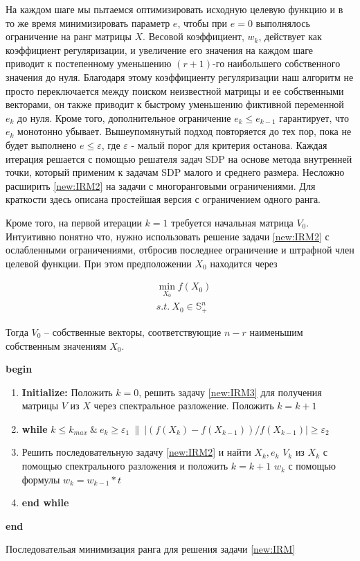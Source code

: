 \documentclass[oneside,final,14pt]{extreport} %
\begin{document}
На каждом шаге мы пытаемся оптимизировать исходную целевую функцию и в то же время минимизировать параметр $e$, чтобы при $e = 0$ выполнялось ограничение на ранг матрицы $X$. Весовой коэффициент, $w_k$, действует как коэффициент регуляризации, и увеличение его значения на каждом шаге приводит к постепенному уменьшению $(r + 1)$-го наибольшего собственного значения до нуля. Благодаря этому коэффициенту регуляризации наш алгоритм не просто переключается между поиском неизвестной матрицы и ее собственными векторами, он также приводит к быстрому уменьшению фиктивной переменной $e_k$ до нуля. Кроме того, дополнительное ограничение $e_k \le e_{k-1}$ гарантирует, что $e_k$ монотонно убывает. Вышеупомянутый подход повторяется до тех пор, пока не будет выполнено $e \le \varepsilon$, где $\varepsilon$ - малый порог для критерия останова. Каждая итерация решается с помощью решателя задач SDP на основе метода внутренней точки, который применим к задачам SDP малого и среднего размера. Несложно расширить \ref{new:IRM2} на задачи с многоранговыми ограничениями. Для краткости здесь описана простейшая версия с ограничением одного ранга.

Кроме того, на первой итерации $k = 1$ требуется начальная матрица $V_0$. Интуитивно понятно что, нужно использовать решение задачи \ref{new:IRM2} с ослабленными ограничениями, отбросив последнее ограничение и штрафной член целевой функции. При этом предположении $X_0$ находится через

\begin{equation}
	\label{new:IRM3}
	\begin{aligned}
	& \min_{X_0} f(X_0) \\
	& s.t. \ X_0 \in \mathbb{S}_+^n
	\end{aligned}
\end{equation}

Тогда $V_0$ -- собственные векторы, соответствующие $n - r$ наименьшим собственным значениям $X_0$.

\begin{algorithm}
\textbf{begin}
\begin{enumerate}
	\item \textbf{Initialize:} Положить $k = 0$, решить задачу \ref{new:IRM3} для получения матрицы $V$ из $X$ через спектральное разложение. Положить $k=k+1$
	\item \textbf{while} $k \le k_{max} \ \& \ e_k \ge \varepsilon_1 \ \|\  |(f(X_k)-
f(X_{k-1}))/f(X_{k-1})| \ge \varepsilon_2$
	\item Решить последовательную задачу \ref{new:IRM2} и найти $X_k, e_k$
	 $V_k$ из $X_k$ с помощью спектрального разложения и положить $k=k+1$
	 $w_k$ с помощью формулы $w_k=w_{k-1} \ast t$
	\item\textbf{end while}
\end{enumerate}
\textbf{end}
\caption{Последовательая минимизация ранга для решения задачи \ref{new:IRM}}
\end{algorithm}
\end{document}

